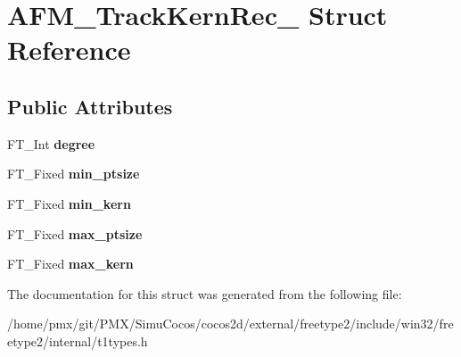 \hypertarget{structAFM__TrackKernRec__}{}\section{A\+F\+M\+\_\+\+Track\+Kern\+Rec\+\_\+ Struct Reference}
\label{structAFM__TrackKernRec__}
\subsection*{Public Attributes}
\begin{DoxyCompactItemize}
\item 
\mbox{\label{structAFM__TrackKernRec___a15272593c1a0ea05ca3687e7c2de26b6}} 
F\+T\+\_\+\+Int {\bfseries degree}
\item 
\mbox{\label{structAFM__TrackKernRec___a7b1e7fd74d92dcf2b89fee7f74d4fdba}} 
F\+T\+\_\+\+Fixed {\bfseries min\+\_\+ptsize}
\item 
\mbox{\label{structAFM__TrackKernRec___aee6f40c722e14ee2fb17948ce19d0499}} 
F\+T\+\_\+\+Fixed {\bfseries min\+\_\+kern}
\item 
\mbox{\label{structAFM__TrackKernRec___a2b22a268fb0654a035ec59d3dfa3dfa4}} 
F\+T\+\_\+\+Fixed {\bfseries max\+\_\+ptsize}
\item 
\mbox{\label{structAFM__TrackKernRec___a8e25a36b738a2de3fa5c08e477b5a6a2}} 
F\+T\+\_\+\+Fixed {\bfseries max\+\_\+kern}
\end{DoxyCompactItemize}


The documentation for this struct was generated from the following file\+:\begin{DoxyCompactItemize}
\item 
/home/pmx/git/\+P\+M\+X/\+Simu\+Cocos/cocos2d/external/freetype2/include/win32/freetype2/internal/t1types.\+h\end{DoxyCompactItemize}
